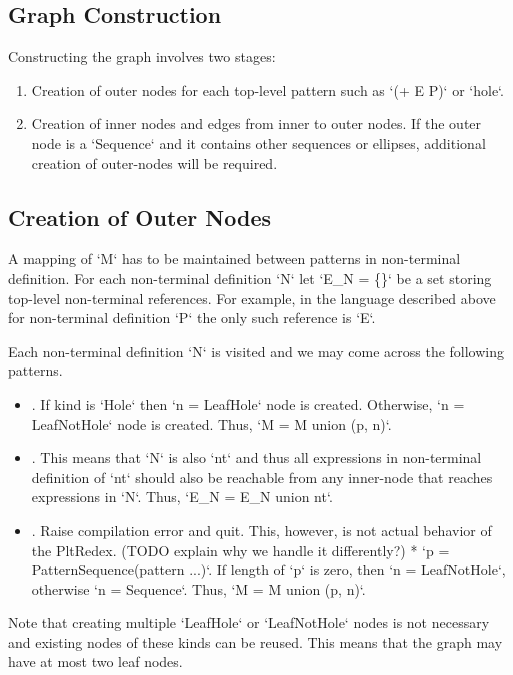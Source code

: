 \subsection{Graph Construction}

Constructing the graph involves two stages:
\begin{enumerate}
\item
Creation of outer nodes for each top-level pattern such as `(+ E P)` or `hole`.
\item
Creation of inner nodes and edges from inner to outer nodes. If the outer node is a `Sequence` and it contains other sequences or ellipses, additional creation of outer-nodes will be required.
\end{enumerate}


\subsection{Creation of Outer Nodes}

A mapping of `M` has to be maintained between patterns in non-terminal definition. For each non-terminal definition `N` let `E\_N = \{\}` be a set storing top-level non-terminal references. For example, in the language described above for non-terminal definition `P` the only such reference is `E`.

Each non-terminal definition `N` is visited and we may come across the following patterns.
\begin{itemize}

\item
\BuiltInPattern. If kind is `Hole` then `n = LeafHole` node is created.  Otherwise, `n = LeafNotHole` node is created. Thus, `M = M union {(p, n)}`.
\item
\Nt. This means that `N` is also `nt` and thus all expressions in non-terminal definition of `nt` should also be reachable from any inner-node that reaches expressions in `N`. Thus, `E\_N = E\_N union {nt}`.
\item
\InHolePattern. Raise compilation error and quit. This, however, is not actual behavior of the PltRedex. (TODO explain why we handle it differently?)
* `p = PatternSequence(pattern ...)`. If length of `p` is zero, then `n = LeafNotHole`, otherwise `n = Sequence`. Thus, `M = M union {(p, n)}`.
\end{itemize}

Note that creating multiple `LeafHole` or `LeafNotHole` nodes is not necessary and existing nodes of these kinds can be reused. This means that the graph may have at most two leaf nodes.


